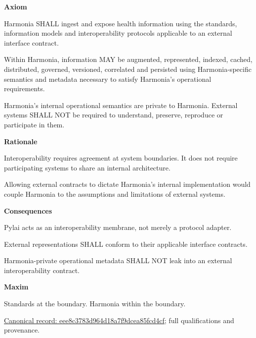\par\medskip\textbf{Axiom}\par


Harmonia SHALL ingest and expose health information using the standards,
information models and interoperability protocols applicable to an
external interface contract.



Within Harmonia, information MAY be augmented, represented, indexed,
cached, distributed, governed, versioned, correlated and persisted using
Harmonia-specific semantics and metadata necessary to satisfy Harmonia's
operational requirements.



Harmonia's internal operational semantics are private to Harmonia.
External systems SHALL NOT be required to understand, preserve,
reproduce or participate in them.



\par\medskip\textbf{Rationale}\par


Interoperability requires agreement at system boundaries. It does not
require participating systems to share an internal architecture.



Allowing external contracts to dictate Harmonia's internal
implementation would couple Harmonia to the assumptions and limitations
of external systems.



\par\medskip\textbf{Consequences}\par


Pylai acts as an interoperability membrane, not merely a protocol
adapter.



External representations SHALL conform to their applicable interface
contracts.



Harmonia-private operational metadata SHALL NOT leak into an external
interoperability contract.



\par\medskip\textbf{Maxim}\par


Standards at the boundary. Harmonia within the boundary.


{\footnotesize \href{../../../../continuum/motivation/principle/eee8c3783d964d18a7f9dcea85fcd4cf.md}{Canonical record: eee8c3783d964d18a7f9dcea85fcd4cf}; full qualifications and provenance.}\par
